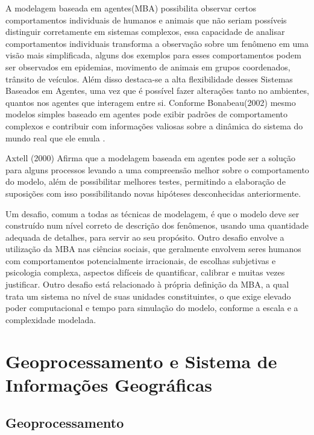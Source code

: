 A modelagem baseada em agentes(MBA) possibilita observar certos comportamentos individuais de humanos e animais que não seriam possíveis distinguir corretamente em sistemas complexos, essa capacidade de analisar comportamentos individuais transforma a observação sobre um fenômeno em uma visão mais simplificada, alguns dos exemplos para esses comportamentos podem ser observados em epidemias, movimento de animais em grupos coordenados, trânsito de veículos. Além disso destaca-se a alta flexibilidade desses Sistemas Baseados em Agentes, uma vez que é possível fazer alterações tanto no ambientes, quantos nos agentes que interagem entre si. Conforme Bonabeau(2002) mesmo modelos simples baseado em agentes pode exibir padrões de comportamento complexos e contribuir com informações valiosas sobre a dinâmica do sistema do mundo real que ele emula \cite{bonabeau2002agent}.


Axtell (2000) Afirma que a modelagem baseada em agentes pode ser a solução para alguns processos levando a uma compreensão melhor sobre o comportamento do modelo, além de possibilitar melhores testes, permitindo a elaboração de suposições com isso possibilitando novas hipóteses desconhecidas anteriormente.\cite{Axtell:online}

Um desafio, comum a todas as técnicas de modelagem, é que o modelo deve ser construído num nível correto de descrição dos fenômenos, usando uma quantidade adequada de detalhes, para servir ao seu propósito. Outro desafio envolve a utilização da MBA nas ciências sociais, que geralmente envolvem seres humanos com comportamentos potencialmente irracionais, de escolhas subjetivas e psicologia complexa, aspectos difíceis de quantificar, calibrar e muitas vezes justificar. Outro desafio está relacionado à própria definição da MBA, a qual trata um sistema no nível de suas unidades constituintes, o que exige elevado poder computacional e tempo para simulação do modelo, conforme a escala e a complexidade modelada.

\section{Geoprocessamento e Sistema de Informações Geográficas}

\subsection{Geoprocessamento}

